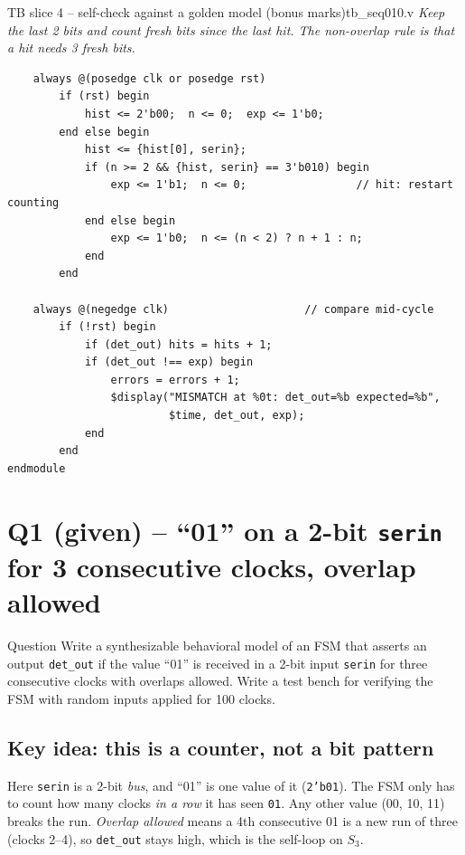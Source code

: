 \documentclass[10pt,a4paper]{article}
\newcommand{\slicenote}[1]{{\small\color{black!70}\itshape #1}\par\smallskip}
\begin{document}
\begin{codeslice}{TB slice 4 -- self-check against a golden model (bonus marks)}{tb\_seq010.v}
\slicenote{Keep the last 2 bits and count fresh bits since the last hit. The non-overlap rule is that a hit needs 3 fresh bits.}
\begin{lstlisting}
    always @(posedge clk or posedge rst)
        if (rst) begin
            hist <= 2'b00;  n <= 0;  exp <= 1'b0;
        end else begin
            hist <= {hist[0], serin};
            if (n >= 2 && {hist, serin} == 3'b010) begin
                exp <= 1'b1;  n <= 0;                 // hit: restart counting
            end else begin
                exp <= 1'b0;  n <= (n < 2) ? n + 1 : n;
            end
        end

    always @(negedge clk)                     // compare mid-cycle
        if (!rst) begin
            if (det_out) hits = hits + 1;
            if (det_out !== exp) begin
                errors = errors + 1;
                $display("MISMATCH at %0t: det_out=%b expected=%b",
                         $time, det_out, exp);
            end
        end
endmodule
\end{lstlisting}
\end{codeslice}


\newpage
\section{Q1 (given) -- ``01'' on a 2-bit \texttt{serin} for 3 consecutive clocks, overlap allowed}
\begin{qbox}{Question}
Write a synthesizable behavioral model of an FSM that asserts an output \texttt{det\_out} if the value ``01''
is received in a 2-bit input \texttt{serin} for three consecutive clocks with overlaps allowed. Write a test
bench for verifying the FSM with random inputs applied for 100 clocks.
\end{qbox}

\subsection{Key idea: this is a counter, not a bit pattern}
Here \texttt{serin} is a 2-bit \emph{bus}, and ``01'' is one value of it (\texttt{2'b01}). The FSM only has to
count how many clocks \emph{in a row} it has seen \texttt{01}. Any other value (00, 10, 11) breaks the run.
\emph{Overlap allowed} means a 4th consecutive 01 is a new run of three (clocks 2--4), so \texttt{det\_out}
stays high, which is the self-loop on $S_3$.
\end{document}
